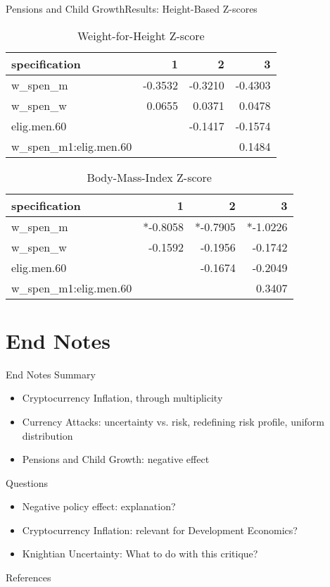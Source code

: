 \documentclass{beamer}
\begin{document}
\begin{frame}{Pensions and Child Growth}{Results: Height-Based Z-scores}
\begin{table}[!ht]
\centering
\caption{Weight-for-Height Z-score}
\label{sa:ta:whz}
\begin{tabular}{l|rrr}
\hline
specification & 1 & 2 & 3 \\
\hline
w\_spen\_m &  -0.3532 & -0.3210 & -0.4303 \\
w\_spen\_w & 0.0655 & 0.0371 & 0.0478 \\
elig.men.60 & & -0.1417 & -0.1574 \\
w\_spen\_m1:elig.men.60 & & & 0.1484 \\
\end{tabular}
\end{table}
\begin{table}[!ht]
\centering
\caption{Body-Mass-Index Z-score}
\label{sa:ta:bmiz}
\begin{tabular}{l|rrr}
\hline
specification & 1 & 2 & 3 \\
\hline
w\_spen\_m & *-0.8058 & *-0.7905 & *-1.0226 \\
w\_spen\_w & -0.1592 & -0.1956 & -0.1742 \\
elig.men.60 & & -0.1674 & -0.2049 \\
w\_spen\_m1:elig.men.60 & & & 0.3407 \\
\end{tabular}
\end{table}
\end{frame}


\section{End Notes}

\begin{frame}{End Notes}
Summary
  \begin{itemize}
  \item
    Cryptocurrency Inflation, through multiplicity
  \item
	Currency Attacks: uncertainty vs. risk, redefining risk profile, uniform distribution 
  \item
    Pensions and Child Growth: negative effect
  \end{itemize}

Questions  
	\begin{itemize}
	\item
		Negative policy effect: explanation?
	\item
		Cryptocurrency Inflation: relevant for Development Economics?
	\item
		Knightian Uncertainty: What to do with this critique?
	\end{itemize}
\end{frame}

\begin{frame}[allowframebreaks]{References}
	\printbibliography
\end{frame}
\end{document}
